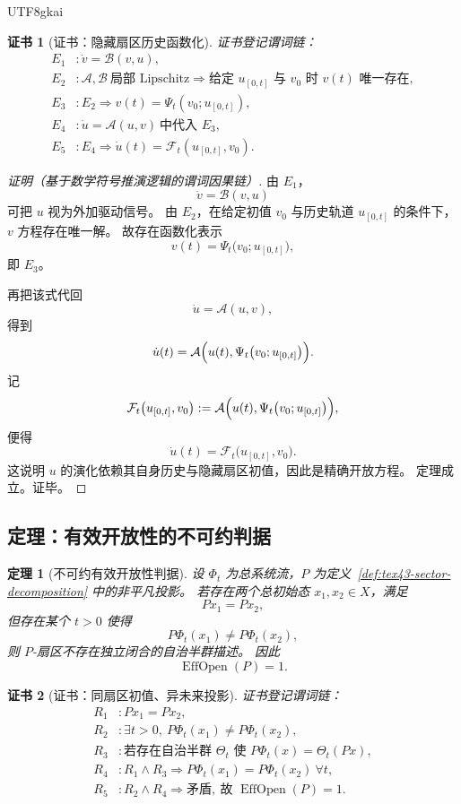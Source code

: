 \documentclass[12pt]{article}
\newtheorem{theorem}{定理}[section]
\newtheorem{Certificate}{证书}[section]
\newcommand{\EffOpen}{\operatorname{EffOpen}}
\begin{document}
\begin{CJK*}{UTF8}{gkai}
\begin{Certificate}[证书：隐藏扇区历史函数化]
\label{cert:tex43-exact-open-equation}
证书登记谓词链：
\[
\begin{aligned}
  E_1 &: \dot v=\mathcal B(v,u),\\
  E_2 &: \mathcal A,\mathcal B\ \text{局部 Lipschitz}\Rightarrow \text{给定 }u_{[0,t]}\text{ 与 }v_0\text{ 时 }v(t)\text{ 唯一存在}
    ,\\
  E_3 &: E_2 \Rightarrow v(t)=\Psi_t(v_0;u_{[0,t]}),\\
  E_4 &: \dot u=\mathcal A(u,v)\ \text{中代入 }E_3,\\
  E_5 &: E_4 \Rightarrow \dot u(t)=\mathcal F_t(u_{[0,t]},v_0).
\end{aligned}
\]
\end{Certificate}

\begin{proof}[证明（基于数学符号推演逻辑的谓词因果链）]
由 $E_1$，
\[
  \dot v=\mathcal B(v,u)
\]
可把 $u$ 视为外加驱动信号。
由 $E_2$，在给定初值 $v_0$ 与历史轨道 $u_{[0,t]}$ 的条件下，$v$ 方程存在唯一解。
故存在函数化表示
\[
  v(t)=\Psi_t\bigl(v_0;u_{[0,t]}\bigr),
\]
即 $E_3$。

再把该式代回
\[
  \dot u=\mathcal A(u,v),
\]
得到
\[
  \dot u(t)
  =
  \mathcal A\Bigl(u(t),\Psi_t\bigl(v_0;u_{[0,t]}\bigr)\Bigr).
\]
记
\[
  \mathcal F_t\bigl(u_{[0,t]},v_0\bigr)
  :=
  \mathcal A\Bigl(u(t),\Psi_t\bigl(v_0;u_{[0,t]}\bigr)\Bigr),
\]
便得
\[
  \dot u(t)=\mathcal F_t\bigl(u_{[0,t]},v_0\bigr).
\]
这说明 $u$ 的演化依赖其自身历史与隐藏扇区初值，因此是精确开放方程。
定理成立。证毕。
\end{proof}

\subsection{定理：有效开放性的不可约判据}
\label{subsec:tex43-ch3-theorem-criterion}

\begin{theorem}[不可约有效开放性判据]
\label{thm:tex43-effective-open-criterion}
设 $\Phi_t$ 为总系统流，$P$ 为定义~\ref{def:tex43-sector-decomposition} 中的非平凡投影。
若存在两个总初始态 $x_1,x_2\in X$，满足
\[
  Px_1=Px_2,
\]
但存在某个 $t>0$ 使得
\[
  P\Phi_t(x_1)\neq P\Phi_t(x_2),
\]
则 $P$-扇区不存在独立闭合的自治半群描述。
因此
\[
  \EffOpen(P)=1.
\]
\end{theorem}

\begin{Certificate}[证书：同扇区初值、异未来投影]
\label{cert:tex43-effective-open-criterion}
证书登记谓词链：
\[
\begin{aligned}
  R_1 &: Px_1=Px_2,\\
  R_2 &: \exists t>0,\ P\Phi_t(x_1)\neq P\Phi_t(x_2),\\
  R_3 &: \text{若存在自治半群 }\Theta_t\text{ 使 }P\Phi_t(x)=\Theta_t(Px),\\
  R_4 &: R_1\wedge R_3 \Rightarrow P\Phi_t(x_1)=P\Phi_t(x_2)\ \forall t,\\
  R_5 &: R_2\wedge R_4 \Rightarrow \text{矛盾},\ \text{故 } \EffOpen(P)=1.
\end{aligned}
\]
\end{Certificate}


\end{CJK*}
\end{document}
